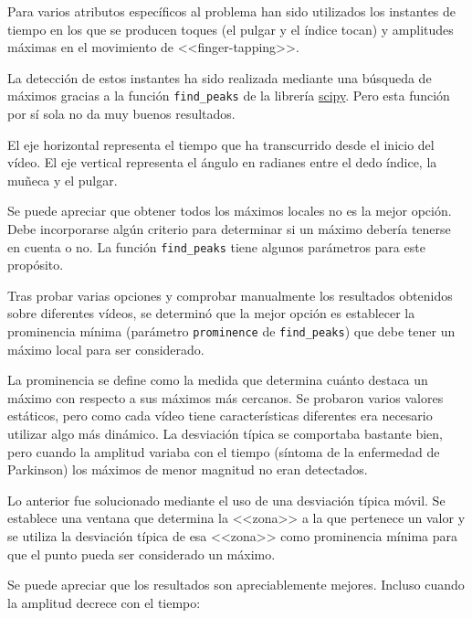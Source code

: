 Para varios atributos específicos al problema han sido utilizados los instantes
de tiempo en los que se producen toques (el pulgar y el índice tocan) y
amplitudes máximas en el movimiento de <<finger-tapping>>.

La detección de estos instantes ha sido realizada mediante una búsqueda de
máximos gracias a la función \texttt{find\_peaks} de la librería
\href{https://scipy.org/}{scipy}. Pero esta función por sí sola no da muy buenos
resultados.


El eje horizontal representa el tiempo que ha transcurrido desde el inicio del
vídeo. El eje vertical representa el ángulo en radianes entre el dedo índice, la
muñeca y el pulgar.

Se puede apreciar que obtener todos los máximos locales no es la mejor opción.
Debe incorporarse algún criterio para determinar si un máximo debería tenerse en
cuenta o no. La función \texttt{find\_peaks} tiene algunos parámetros para este
propósito.

Tras probar varias opciones y comprobar manualmente los resultados obtenidos
sobre diferentes vídeos, se determinó que la mejor opción es establecer la
prominencia mínima (parámetro \texttt{prominence} de \texttt{find\_peaks}) que
debe tener un máximo local para ser considerado.

La prominencia se define como la medida que determina cuánto destaca un máximo
con respecto a sus máximos más cercanos. Se probaron varios valores estáticos,
pero como cada vídeo tiene características diferentes era necesario utilizar
algo más dinámico. La desviación típica se comportaba bastante bien, pero cuando
la amplitud variaba con el tiempo (síntoma de la enfermedad de Parkinson) los
máximos de menor magnitud no eran detectados.

Lo anterior fue solucionado  mediante el uso de una desviación típica móvil. Se
establece una ventana que determina la <<zona>> a la que pertenece un valor y se
utiliza la desviación típica de esa <<zona>> como prominencia mínima para que el
punto pueda ser considerado un máximo.


Se puede apreciar que los resultados son apreciablemente mejores. Incluso cuando
la amplitud decrece con el tiempo:

